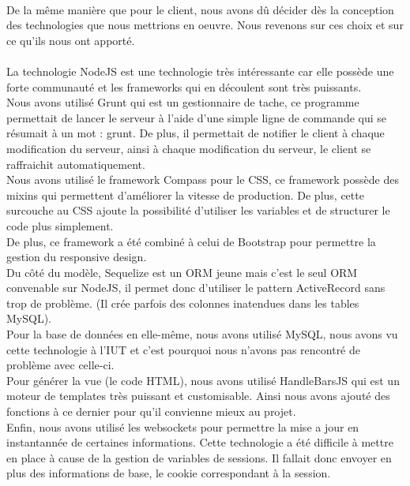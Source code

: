 \paragraph{}
De la même manière que pour le client, nous avons dû décider dès la conception des technologies que nous mettrions en oeuvre. Nous revenons sur ces choix et sur ce qu'ils nous ont apporté. 

\paragraph{}
La technologie NodeJS est une technologie très intéressante car elle possède une forte communauté et les frameworks qui en découlent sont très puissants. \\
Nous avons utilisé Grunt qui est un gestionnaire de tache, ce programme permettait de lancer le serveur à l'aide d'une simple ligne de commande qui se résumait à un mot : grunt. De plus, il permettait de notifier le client à chaque modification du serveur, ainsi à chaque modification du serveur, le client se raffraichit automatiquement. \\
Nous avons utilisé le framework Compass pour le CSS, ce framework possède des mixins qui permettent d'améliorer la vitesse de production. De plus, cette surcouche au CSS ajoute la possibilité d'utiliser les variables et de structurer le code plus simplement. \\ De plus, ce framework a été combiné à celui de Bootstrap pour permettre la gestion du responsive design. \\
Du côté du modèle, Sequelize est un ORM jeune mais c'est le seul ORM convenable sur NodeJS, il permet donc d'utiliser le pattern ActiveRecord sans trop de problème. (Il crée parfois des colonnes inatendues dans les tables MySQL). \\
Pour la base de données en elle-même, nous avons utilisé MySQL, nous avons vu cette technologie à l'IUT et c'est pourquoi nous n'avons pas rencontré de problème avec celle-ci. \\
Pour générer la vue (le code HTML), nous avons utilisé HandleBarsJS qui est un moteur de templates très puissant et customisable. Ainsi nous avons ajouté des fonctions à ce dernier pour qu'il convienne mieux au projet. \\
Enfin, nous avons utilisé les websockets pour permettre la mise a jour en instantannée de certaines informations. Cette technologie a été difficile à mettre en place à cause de la gestion de variables de sessions. Il fallait donc envoyer en plus des informations de base, le cookie correspondant à la session.
